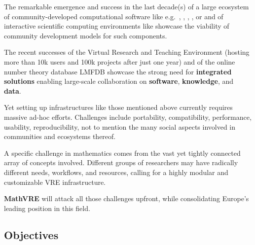 \documentclass[a4paper,11pt]{article}
\newcommand{\XX}{\textbf{MathVRE}\xspace}
\newcommand{\TheProject}{\XX}
\begin{document}
The remarkable emergence and success in the last decade(s) of a large
ecosystem of community-developed computational software like
e.g.\ \GAP, \Linbox, \PariGP, \Sage, or \Singular and of interactive
scientific computing environments like \IPython showcase the viability
of community development models for such components.

The recent successes of the Virtual Research and Teaching Environment
\SMC (hosting more than 10k users and 100k projects after just
one year) and of the online number theory database LMFDB showcase the
strong need for \textbf{integrated solutions} enabling large-scale
collaboration on \textbf{software}, \textbf{knowledge}, and \textbf{data}.

Yet setting up infrastructures like those mentioned above currently requires
massive ad-hoc efforts. Challenges include portability, compatibility,
performance, usability, reproducibility, not to mention the many
social aspects involved in communities and ecosystems thereof.


A specific challenge in mathematics comes from the vast yet tightly
connected array of concepts involved. Different groups of researchers
may have radically different needs, workflows, and resources, calling
for a highly modular and customizable VRE infrastructure.

\TheProject will attack all those challenges upfront, while
consolidating Europe's leading position in this field.



\subsection{Objectives}
\label{sect:objectives}

\end{document}
